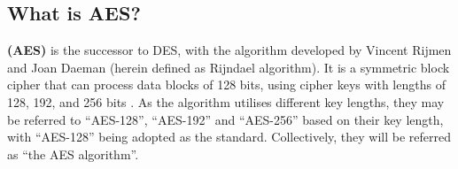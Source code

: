 \subsection{What is AES?}

\textbf{ (\gls{AES})} is the successor to \gls{DES}, with the algorithm developed by Vincent Rijmen and Joan Daeman (herein defined as Rijndael algorithm). 
It is a symmetric block cipher that can process data blocks of 128 bits, using cipher keys with lengths of 128, 192, and 256 bits \cite{NIST_AES}.
As the algorithm utilises different key lengths, they may be referred to ``\gls{AES}-128'', ``\gls{AES}-192'' and ``\gls{AES}-256'' based on their key length, with ``\gls{AES}-128'' being adopted as the standard. 
Collectively, they will be referred as ``the \gls{AES} algorithm''.

